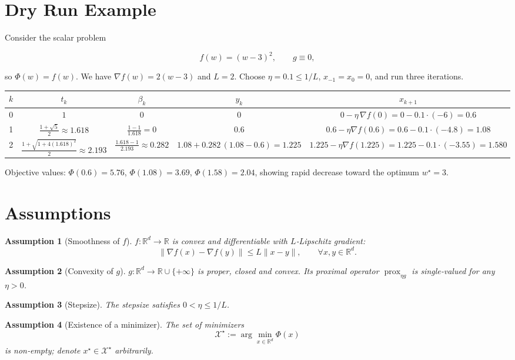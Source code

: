 \documentclass{article}
\newtheorem{assumption}{Assumption}
\newcommand{\prox}{\operatorname{prox}}
\newcommand{\R}{\mathbb{R}}
\begin{document}
\section*{Dry Run Example}
Consider the scalar problem  

\[
f(w)=(w-3)^{2},\qquad g\equiv0,
\]

so $\Phi(w)=f(w)$.  
We have $\nabla f(w)=2(w-3)$ and $L=2$. Choose $\eta=0.1\le 1/L$, $x_{-1}=x_{0}=0$, and run three iterations.

\begin{center}
\begin{tabular}{c|c|c|c|c}
 $k$ & $t_k$ & $\beta_k$ & $y_k$ & $x_{k+1}$ \\ \hline
0 & $1$ & $0$ & $0$ & $0-\eta\,\nabla f(0)=0-0.1\cdot(-6)=0.6$ \\[4pt]
1 & $\frac{1+\sqrt{5}}{2}\approx1.618$ & $\frac{1-1}{1.618}=0$ & $0.6$ & $0.6-\eta\nabla f(0.6)=0.6-0.1\cdot(-4.8)=1.08$ \\[4pt]
2 & $\frac{1+\sqrt{1+4(1.618)^{2}}}{2}\approx2.193$ & $\frac{1.618-1}{2.193}\approx0.282$ & 
$1.08+0.282\,(1.08-0.6)=1.225$ &
$1.225-\eta\nabla f(1.225)=1.225-0.1\cdot(-3.55)=1.580$ 
\end{tabular}
\end{center}

Objective values: $\Phi(0.6)=5.76$, $\Phi(1.08)=3.69$, $\Phi(1.58)=2.04$, showing rapid decrease toward the optimum $w^{\star}=3$.

\newpage
\section*{Assumptions}
\begin{assumption}[Smoothness of $f$]\label{as:smooth}
$f:\R^{d}\to\R$ is convex and differentiable with $L$‑Lipschitz gradient:
\[
\|\nabla f(x)-\nabla f(y)\| \le L\|x-y\|,\qquad\forall x,y\in\R^{d}.
\]
\end{assumption}

\begin{assumption}[Convexity of $g$]\label{as:convex}
$g:\R^{d}\to\R\cup\{+\infty\}$ is proper, closed and convex. Its proximal operator $\prox_{\eta g}$ is single‑valued for any $\eta>0$.
\end{assumption}

\begin{assumption}[Stepsize]\label{as:stepsize}
The stepsize satisfies $0<\eta\le 1/L$.
\end{assumption}

\begin{assumption}[Existence of a minimizer]\label{as:opt}
The set of minimizers 
\[
\mathcal{X}^{\star}:=\arg\min_{x\in\R^{d}}\Phi(x)
\]
is non‑empty; denote $x^{\star}\in\mathcal{X}^{\star}$ arbitrarily.
\end{assumption}
\end{document}
